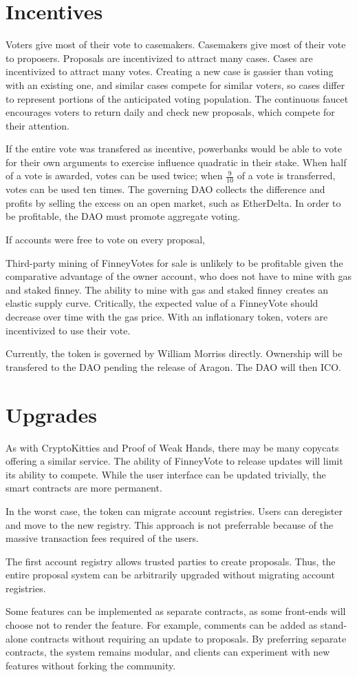 \documentclass{article}
\begin{document}
\section{Incentives}
Voters give most of their vote to casemakers.
Casemakers give most of their vote to proposers.
Proposals are incentivized to attract many cases.
Cases are incentivized to attract many votes.
Creating a new case is gassier than voting with an existing one, and similar cases compete for similar voters, so cases differ to represent portions of the anticipated voting population.
The continuous faucet encourages voters to return daily and check new proposals, which compete for their attention.
\par
If the entire vote was transfered as incentive, powerbanks would be able to vote for their own arguments to exercise influence quadratic in their stake.
When half of a vote is awarded, votes can be used twice; when $\frac{9}{10}$ of a vote is transferred, votes can be used ten times.
The governing DAO collects the difference and profits by selling the excess on an open market, such as EtherDelta.
In order to be profitable, the DAO must promote aggregate voting.
\par
If accounts were free to vote on every proposal, 
\par
Third-party mining of FinneyVotes for sale is unlikely to be profitable given the comparative advantage of the owner account, who does not have to mine with gas and staked finney.
The ability to mine with gas and staked finney creates an elastic supply curve.
Critically, the expected value of a FinneyVote should decrease over time with the gas price.
With an inflationary token, voters are incentivized to use their vote.
\par
Currently, the token is governed by William Morriss directly.
Ownership will be transfered to the DAO pending the release of Aragon.
The DAO will then ICO.
\section{Upgrades}
As with CryptoKitties and Proof of Weak Hands, there may be many copycats offering a similar service.
The ability of FinneyVote to release updates will limit its ability to compete.
While the user interface can be updated trivially, the smart contracts are more permanent.
\par
In the worst case, the token can migrate account registries.
Users can deregister and move to the new registry.
This approach is not preferrable because of the massive transaction fees required of the users.
\par
The first account registry allows trusted parties to create proposals.
Thus, the entire proposal system can be arbitrarily upgraded without migrating account registries.
\par
Some features can be implemented as separate contracts, as some front-ends will choose not to render the feature.
For example, comments can be added as stand-alone contracts without requiring an update to proposals.
By preferring separate contracts, the system remains modular, and clients can experiment with new features without forking the community.
\end{document}
